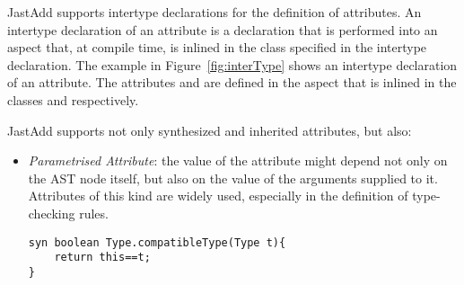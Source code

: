 JastAdd supports intertype declarations for the definition of attributes. An intertype declaration
of an attribute is a declaration that is performed into an aspect that, at compile time, 
is inlined in the class specified in the intertype declaration. The example in Figure~\ref{fig:interType}
shows an intertype declaration of an attribute. 
The attributes  and  are defined in the aspect  
that is inlined in the classes  and  respectively.

JastAdd supports not only synthesized and inherited attributes, but also:
\begin{itemize}
    \item \emph{Parametrised Attribute}: the value of the attribute might depend
    not only on the AST node itself, but also on the value of the arguments supplied
    to it. Attributes of this kind are widely used, especially in the definition of 
    type-checking rules.
    \begin{lstlisting}[language=JastAdd]
syn boolean Type.compatibleType(Type t){
    return this==t;
}
    \end{lstlisting}
    


\end{itemize}
